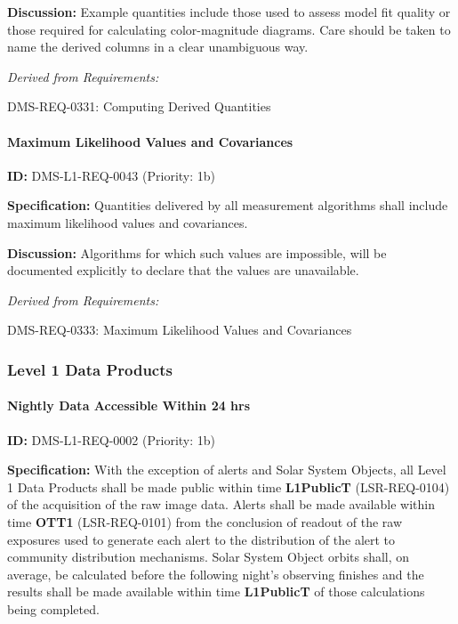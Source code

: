 \documentclass[SE,toc,lsstdraft]{lsstdoc}
\begin{document}
\textbf{Discussion:} Example quantities include those used to assess model fit quality or those required for calculating color-magnitude diagrams. Care should be taken to name the derived columns in a clear unambiguous way.

\emph{Derived from Requirements:}

DMS-REQ-0331:
Computing Derived Quantities \newline

\paragraph{Maximum Likelihood Values and Covariances}\hfill  %

\label{DMS-L1-REQ-0043}
\textbf{ID:} DMS-L1-REQ-0043 (Priority: 1b)

\textbf{Specification:} Quantities delivered by all measurement algorithms shall include maximum likelihood values and covariances.

\textbf{Discussion:} Algorithms for which such values are impossible, will be documented explicitly to declare that the values are unavailable.

\emph{Derived from Requirements:}

DMS-REQ-0333:
Maximum Likelihood Values and Covariances \newline

\subsubsection{Level 1 Data Products}

\paragraph{Nightly Data Accessible Within 24 hrs}\hfill  %

\label{DMS-L1-REQ-0002}
\textbf{ID:} DMS-L1-REQ-0002 (Priority: 1b)

\textbf{Specification:} With the exception of alerts and Solar System Objects, all Level 1 Data Products shall be made public within time \textbf{L1PublicT} (LSR-REQ-0104) of the acquisition of the raw image data. Alerts shall be made available within time \textbf{OTT1} (LSR-REQ-0101) from the conclusion of readout of the raw exposures used to generate each alert to the distribution of the alert to community distribution mechanisms.  Solar System Object orbits shall, on average, be calculated before the following night's observing finishes and the results shall be made available within time \textbf{L1PublicT} of those calculations being completed.
\end{document}
